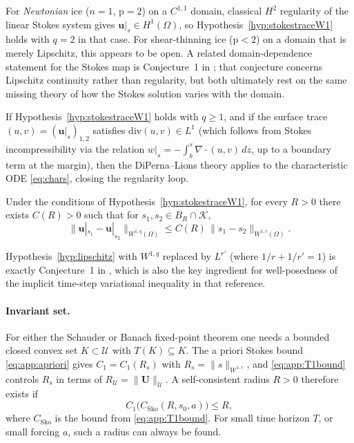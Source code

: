 \documentclass[hidelinks,onefignum,onetabnum,final]{siamart220329}  %
\newcommand{\Div}{\nabla\cdot}
\newcommand{\bu}{\mathbf{u}}
\newcommand{\bU}{\mathbf{U}}
\newcommand{\cK}{\mathcal{K}}
\newcommand{\cU}{\mathcal{U}}
\newcommand{\pp}{\mathrm{p}}
\begin{document}
\noindent
For \emph{Newtonian} ice ($n=1$, $\pp=2$) on a $C^{1,1}$ domain,
classical $H^2$ regularity of the linear Stokes system gives
$\bu|_s \in H^1(\Omega)$, so Hypothesis~\ref{hyp:stokestraceW1} holds
with $q=2$ in that case.
For shear-thinning ice ($\pp<2$) on a domain that is merely Lipschitz,
this appears to be open.
A related domain-dependence statement for the Stokes map is
Conjecture~1 in \cite{Bueler2025}; that conjecture concerns
Lipschitz continuity rather than regularity, but both ultimately
rest on the same missing theory of how the Stokes solution varies
with the domain.

If Hypothesis~\ref{hyp:stokestraceW1} holds with $q\ge 1$, and if
the surface trace $(u,v) = (\bu|_s)_{1,2}$ satisfies
$\mathrm{div}(u,v) \in L^1$ (which follows from Stokes
incompressibility via the relation $w|_s = -\int_b^s \Div(u,v)\,dz$,
up to a boundary term at the margin), then the DiPerna--Lions
theory \cite{DiPernaLions1989} applies to the characteristic ODE
\eqref{eq:chars}, closing the regularity loop.

\begin{hypothesis}
\label{hyp:lipschitz}
Under the conditions of Hypothesis~\ref{hyp:stokestraceW1}, for every
$R>0$ there exists $C(R)>0$ such that for $s_1,s_2\in B_R\cap\cK$,
\begin{equation}
\|\bu|_{s_1} - \bu|_{s_2}\|_{W^{1,q}(\Omega)} \le
C(R)\,\|s_1-s_2\|_{W^{1,r}(\Omega)}.  \label{eq:app:hyp2}
\end{equation}
\end{hypothesis}

\noindent
Hypothesis~\ref{hyp:lipschitz} with $W^{1,q}$ replaced by $L^{r'}$
(where $1/r+1/r'=1$) is exactly Conjecture~1 in \cite{Bueler2025},
which is also the key ingredient for well-posedness of the implicit
time-step variational inequality in that reference.

\paragraph{Invariant set.}
For either the Schauder or Banach fixed-point theorem one needs a
bounded closed convex set $K\subset\cU$ with $T(K)\subseteq K$.
The a priori Stokes bound \eqref{eq:app:apriori} gives
$C_1=C_1(R_s)$ with $R_s = \|s\|_{W^{1,r}}$, and
\eqref{eq:app:T1bound} controls $R_s$ in terms of
$R_\cU=\|\bU\|_\cU$.
A self-consistent radius $R>0$ therefore exists if
\begin{equation}
C_1\bigl(C_{\mathrm{Sko}}(R,s_0,a)\bigr) \le R,
\label{eq:app:selfconsistent}
\end{equation}
where $C_{\mathrm{Sko}}$ is the bound from \eqref{eq:app:T1bound}.
For small time horizon $T$, or small forcing $a$, such a radius
can always be found.
\end{document}
